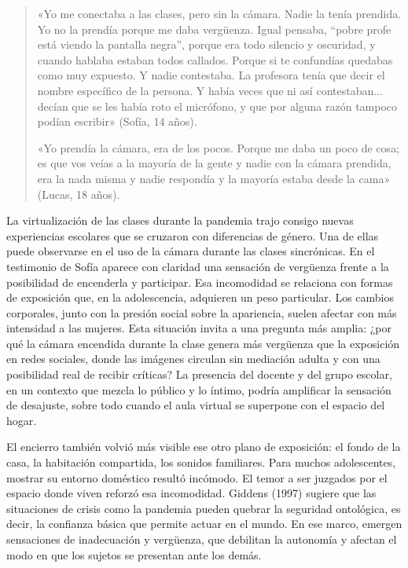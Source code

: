 \begin{quote}
«Yo me conectaba a las clases, pero sin la cámara. Nadie la tenía prendida. Yo no la prendía porque me daba vergüenza. Igual pensaba, ``pobre profe está viendo la pantalla negra'', porque era todo silencio y oscuridad, y cuando hablaba estaban todos callados. Porque si te confundías quedabas como muy expuesto. Y nadie contestaba. La profesora tenía que decir el nombre específico de la persona. Y había veces que ni así contestaban... decían que se les había roto el micrófono, y que por alguna razón tampoco podían escribir» (Sofía, 14 años).

«Yo prendía la cámara, era de los pocos. Porque me daba un poco de cosa; es que vos veías a la mayoría de la gente y nadie con la cámara prendida, era la nada misma y nadie respondía y la mayoría estaba desde la cama» (Lucas, 18 años).
\end{quote}

La virtualización de las clases durante la pandemia trajo consigo nuevas experiencias escolares que se cruzaron con diferencias de género. Una de ellas puede observarse en el uso de la cámara durante las clases sincrónicas. En el testimonio de Sofía aparece con claridad una sensación de vergüenza frente a la posibilidad de encenderla y participar. Esa incomodidad se relaciona con formas de exposición que, en la adolescencia, adquieren un peso particular. Los cambios corporales, junto con la presión social sobre la apariencia, suelen afectar con más intensidad a las mujeres. Esta situación invita a una pregunta más amplia: ¿por qué la cámara encendida durante la clase genera más vergüenza que la exposición en redes sociales, donde las imágenes circulan sin mediación adulta y con una posibilidad real de recibir críticas? La presencia del docente y del grupo escolar, en un contexto que mezcla lo público y lo íntimo, podría amplificar la sensación de desajuste, sobre todo cuando el aula virtual se superpone con el espacio del hogar.

El encierro también volvió más visible ese otro plano de exposición: el fondo de la casa, la habitación compartida, los sonidos familiares. Para muchos adolescentes, mostrar su entorno doméstico resultó incómodo. El temor a ser juzgados por el espacio donde viven reforzó esa incomodidad. Giddens (1997) sugiere que las situaciones de crisis como la pandemia pueden quebrar la seguridad ontológica, es decir, la confianza básica que permite actuar en el mundo. En ese marco, emergen sensaciones de inadecuación y vergüenza, que debilitan la autonomía y afectan el modo en que los sujetos se presentan ante los demás.

